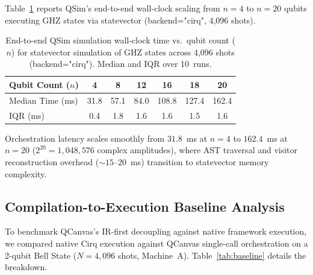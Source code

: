 \documentclass[runningheads]{llncs}
\begin{document}
Table~\ref{tab:simulation_scaling} reports QSim's end-to-end wall-clock scaling from $n=4$ to $n=20$ qubits executing GHZ states via statevector (backend="cirq", 4,096 shots).

\begin{table}[htbp]
\centering
\caption{End-to-end QSim simulation wall-clock time vs.\ qubit count ($n$) for statevector simulation of GHZ states across 4,096 shots (backend="cirq"). Median and IQR over 10~runs.}
\label{tab:simulation_scaling}
\renewcommand{\arraystretch}{1.15}
\setlength{\tabcolsep}{10pt}
\begin{tabular}{@{}lcccccc@{}}
\toprule
\textbf{Qubit Count ($n$)} & \textbf{4} & \textbf{8} & \textbf{12} & \textbf{16} & \textbf{18} & \textbf{20} \\
\midrule
Median Time (ms) & 31.8 & 57.1 & 84.0 & 108.8 & 127.4 & 162.4 \\
IQR (ms)         & 0.4  & 1.8  & 1.6  & 1.6   & 1.5   & 1.6   \\
\bottomrule
\end{tabular}
\end{table}

Orchestration latency scales smoothly from $31.8$~ms at $n=4$ to $162.4$~ms at $n=20$ ($2^{20} = 1,048,576$ complex amplitudes), where AST traversal and visitor reconstruction overhead ($\sim 15$--$20$~ms) transition to statevector memory complexity.

\subsection{Compilation-to-Execution Baseline Analysis}

To benchmark QCanvas's IR-first decoupling against native framework execution, we compared native Cirq execution against QCanvas single-call orchestration on a 2-qubit Bell State ($N=4,096$ shots, Machine~A). Table~\ref{tab:baseline} details the breakdown.

\begin{table}[htbp]
\centering
\caption{Baseline comparison: native framework invocation vs.\ QCanvas single-call compile-and-execute orchestration (Bell State, 2q, 4,096 shots, Machine~A).}
\label{tab:baseline}
\renewcommand{\arraystretch}{1.15}
\setlength{\tabcolsep}{12pt}
\end{table}
\end{document}
